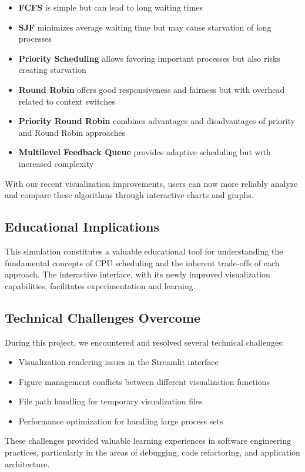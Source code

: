 \documentclass[12pt,a4paper]{article}
\begin{document}
\begin{itemize}
    \item \textbf{FCFS} is simple but can lead to long waiting times
    \item \textbf{SJF} minimizes average waiting time but may cause starvation of long processes
    \item \textbf{Priority Scheduling} allows favoring important processes but also risks creating starvation
    \item \textbf{Round Robin} offers good responsiveness and fairness but with overhead related to context switches
    \item \textbf{Priority Round Robin} combines advantages and disadvantages of priority and Round Robin approaches
    \item \textbf{Multilevel Feedback Queue} provides adaptive scheduling but with increased complexity
\end{itemize}

With our recent visualization improvements, users can now more reliably analyze and compare these algorithms through interactive charts and graphs.

\subsection{Educational Implications}
This simulation constitutes a valuable educational tool for understanding the fundamental concepts of CPU scheduling and the inherent trade-offs of each approach. The interactive interface, with its newly improved visualization capabilities, facilitates experimentation and learning.

\subsection{Technical Challenges Overcome}
During this project, we encountered and resolved several technical challenges:
\begin{itemize}
    \item Visualization rendering issues in the Streamlit interface
    \item Figure management conflicts between different visualization functions
    \item File path handling for temporary visualization files
    \item Performance optimization for handling large process sets
\end{itemize}

These challenges provided valuable learning experiences in software engineering practices, particularly in the areas of debugging, code refactoring, and application architecture.
\end{document}
